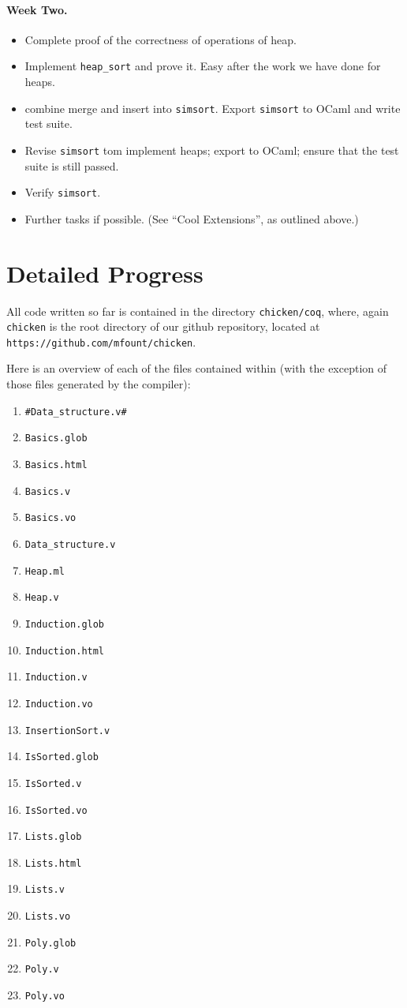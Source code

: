 \documentclass{article}
\begin{document}
\paragraph{Week Two.}
\begin{itemize}
\item Complete proof of the correctness of operations of heap.
\item Implement \verb+heap_sort+ and prove it. Easy after the work we have done for heaps.
\item combine merge and insert into \verb`simsort`.
  Export \verb+simsort+ to OCaml and write test suite.
\item Revise \verb`simsort` tom implement heaps; export to OCaml;
  ensure that the test suite is still passed.
\item Verify \verb`simsort`.
\item Further tasks if possible. (See ``Cool Extensions'', as outlined above.)
\end{itemize}


\section{Detailed Progress}
All code written so far is contained in the directory
\verb`chicken/coq`, where, again
\verb|chicken| is the root directory of our github
repository, located at \verb|https://github.com/mfount/chicken|.

Here is an overview of each of the files contained within
(with the exception of those files generated by the compiler):
\begin{enumerate}
\item \verb`#Data_structure.v#`
\item \verb`Basics.glob`
\item \verb`Basics.html`
\item \verb`Basics.v`
\item \verb`Basics.vo`
\item \verb`Data_structure.v`
\item \verb`Heap.ml`
\item \verb`Heap.v`
\item \verb`Induction.glob`
\item \verb`Induction.html`
\item \verb`Induction.v`
\item \verb`Induction.vo`
\item \verb`InsertionSort.v`
\item \verb`IsSorted.glob`
\item \verb`IsSorted.v`
\item \verb`IsSorted.vo`
\item \verb`Lists.glob`
\item \verb`Lists.html`
\item \verb`Lists.v`
\item \verb`Lists.vo`
\item \verb`Poly.glob`
\item \verb`Poly.v`
\item \verb`Poly.vo`
\end{enumerate}
\end{document}
